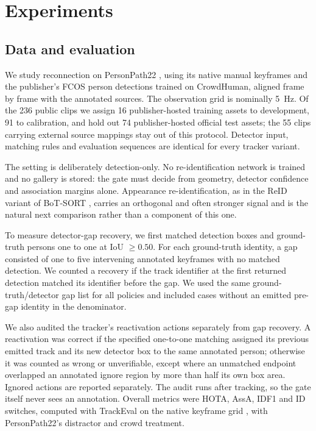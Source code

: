 \section{Experiments}

\subsection{Data and evaluation}
We study reconnection on PersonPath22 \cite{shuai2022personpath22}, using
its native manual keyframes and the publisher's FCOS person detections
trained on CrowdHuman, aligned frame by frame with the annotated sources.
The observation grid is nominally 5~Hz. Of the 236 public clips we assign
16 publisher-hosted training assets to development, 91 to calibration, and
hold out 74 publisher-hosted official test assets; the 55 clips carrying
external source mappings stay out of this protocol. Detector input,
matching rules and evaluation sequences are identical for every tracker
variant.

The setting is deliberately detection-only. No re-identification network
is trained and no gallery is stored: the gate must decide from geometry,
detector confidence and association margins alone. Appearance
re-identification, as in the ReID variant of BoT-SORT
\cite{aharon2022botsort}, carries an orthogonal and often stronger signal
and is the natural next comparison rather than a component of this one.

To measure detector-gap recovery, we first matched detection boxes and
ground-truth persons one to one at IoU $\geq 0.50$. For each ground-truth
identity, a gap consisted of one to five intervening annotated keyframes
with no matched detection. We counted a recovery if the track identifier
at the first returned detection matched its identifier before the gap. We
used the same ground-truth/detector gap list for all policies and included
cases without an emitted pre-gap identity in the denominator.

We also audited the tracker's reactivation actions separately from gap
recovery. A reactivation was correct if the specified one-to-one matching
assigned its previous emitted track and its new detector box to the same
annotated person; otherwise it was counted as wrong or unverifiable,
except where an unmatched endpoint overlapped an annotated ignore region
by more than half its own box area. Ignored actions are reported
separately. The audit runs after tracking, so the gate itself never sees
an annotation. Overall metrics were HOTA, AssA, IDF1 and ID switches,
computed with TrackEval on the native keyframe grid
\cite{luiten2021hota}, with PersonPath22's distractor and crowd treatment.

